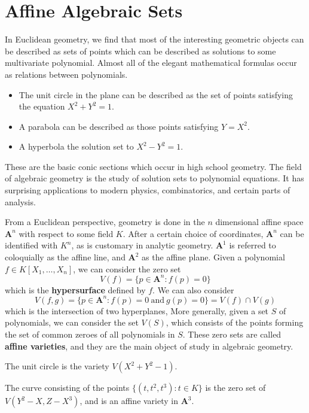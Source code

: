 \chapter{Affine Algebraic Sets}

In Euclidean geometry, we find that most of the interesting geometric objects can be described as sets of points which can be described as solutions to some multivariate polynomial. Almost all of the elegant mathematical formulas occur as relations between polynomials.
%
\begin{itemize}
    \item The unit circle in the plane can be described as the set of points satisfying the equation $X^2 + Y^2 = 1$.
    \item A parabola can be described as those points satisfying $Y = X^2$.
    \item A hyperbola the solution set to $X^2 - Y^2 = 1$.
\end{itemize}
%
These are the basic conic sections which occur in high school geometry. The field of algebraic geometry is the study of solution sets to polynomial equations. It has surprising applications to modern physics, combinatorics, and certain parts of analysis.

From a Euclidean perspective, geometry is done in the $n$ dimensional affine space $\mathbf{A}^n$ with respect to some field $K$. After a certain choice of coordinates, $\mathbf{A}^n$ can be identified with $K^n$, as is customary in analytic geometry. $\mathbf{A}^1$ is referred to coloquially as the affine line, and $\mathbf{A}^2$ as the affine plane. Given a polynomial $f \in K[X_1, \dots, X_n]$, we can consider the zero set
%
\[ V(f) = \{ p \in \mathbf{A}^n : f(p) = 0 \} \]
%
which is the {\bf hypersurface} defined by $f$. We can also consider
%
\[ V(f,g) = \{ p \in \mathbf{A}^n: f(p) = 0\ \text{and}\ g(p) = 0 \} = V(f) \cap V(g) \]
%
which is the intersection of two hyperplanes, More generally, given a set $S$ of polynomials, we can consider the set $V(S)$, which consists of the points forming the set of common zeroes of all polynomials in $S$. These zero sets are called {\bf affine varieties}, and they are the main object of study in algebraic geometry.

\begin{example}
    The unit circle is the variety $V(X^2 + Y^2 - 1)$.
\end{example}

\begin{example}
    The curve consisting of the points $\{ (t,t^2,t^3): t \in K \}$ is the zero set of $V(Y^2 - X, Z - X^3)$, and is an affine variety in $\mathbf{A}^3$.
\end{example}

